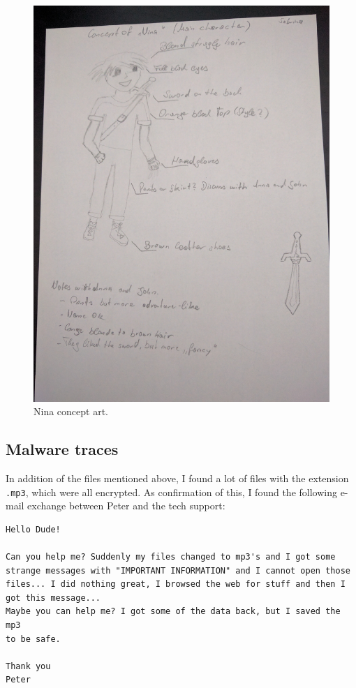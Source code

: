 \documentclass[12pt]{article}
\begin{document}
\begin{figure}[!ht]
    \centering
    \includegraphics[width=\textwidth]{images/nina_concept.jpg}
    \caption{Nina concept art.}
    \label{fig:nina}
\end{figure}

\subsection{Malware traces}

In addition of the files mentioned above, I found a lot of files with the extension \texttt{.mp3}, which were all encrypted.
As confirmation of this, I found the following e-mail exchange between Peter and the tech support:

\begin{verbatim}
Hello Dude!

Can you help me? Suddenly my files changed to mp3's and I got some
strange messages with "IMPORTANT INFORMATION" and I cannot open those
files... I did nothing great, I browsed the web for stuff and then I
got this message...
Maybe you can help me? I got some of the data back, but I saved the mp3
to be safe.

Thank you
Peter
\end{verbatim}
\end{document}
